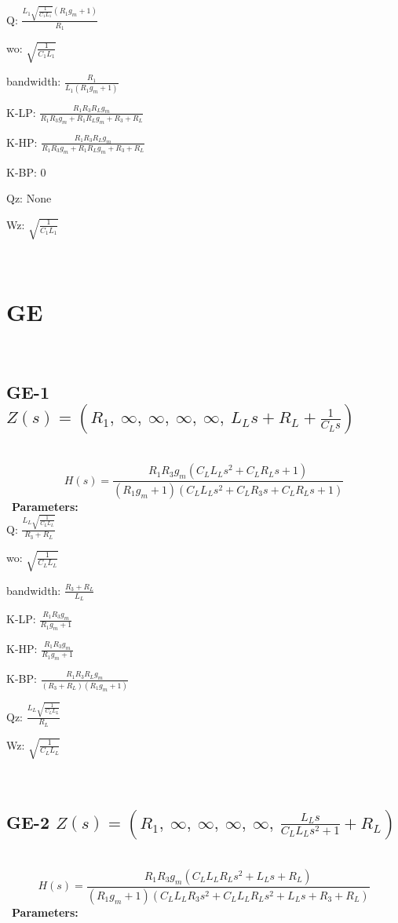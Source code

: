\documentclass{article}
\begin{document}
Q: $\frac{L_{1} \sqrt{\frac{1}{C_{1} L_{1}}} \left(R_{1} g_{m} + 1\right)}{R_{1}}$\ 

wo: $\sqrt{\frac{1}{C_{1} L_{1}}}$\ 

bandwidth: $\frac{R_{1}}{L_{1} \left(R_{1} g_{m} + 1\right)}$\ 

K-LP: $\frac{R_{1} R_{3} R_{L} g_{m}}{R_{1} R_{3} g_{m} + R_{1} R_{L} g_{m} + R_{3} + R_{L}}$\ 

K-HP: $\frac{R_{1} R_{3} R_{L} g_{m}}{R_{1} R_{3} g_{m} + R_{1} R_{L} g_{m} + R_{3} + R_{L}}$\ 

K-BP: $0$\ 

Qz: $\text{None}$\ 

Wz: $\sqrt{\frac{1}{C_{1} L_{1}}}$\ 

\ 

\section{GE}\ 
\subsection{GE-1 $Z(s) = \left( R_{1}, \  \infty, \  \infty, \  \infty, \  \infty, \  L_{L} s + R_{L} + \frac{1}{C_{L} s}\right)$ } \ 
\textbf{\[H(s) = \frac{R_{1} R_{3} g_{m} \left(C_{L} L_{L} s^{2} + C_{L} R_{L} s + 1\right)}{\left(R_{1} g_{m} + 1\right) \left(C_{L} L_{L} s^{2} + C_{L} R_{3} s + C_{L} R_{L} s + 1\right)}\] } \ 
\textbf{Parameters:}\\ 

Q: $\frac{L_{L} \sqrt{\frac{1}{C_{L} L_{L}}}}{R_{3} + R_{L}}$\ 

wo: $\sqrt{\frac{1}{C_{L} L_{L}}}$\ 

bandwidth: $\frac{R_{3} + R_{L}}{L_{L}}$\ 

K-LP: $\frac{R_{1} R_{3} g_{m}}{R_{1} g_{m} + 1}$\ 

K-HP: $\frac{R_{1} R_{3} g_{m}}{R_{1} g_{m} + 1}$\ 

K-BP: $\frac{R_{1} R_{3} R_{L} g_{m}}{\left(R_{3} + R_{L}\right) \left(R_{1} g_{m} + 1\right)}$\ 

Qz: $\frac{L_{L} \sqrt{\frac{1}{C_{L} L_{L}}}}{R_{L}}$\ 

Wz: $\sqrt{\frac{1}{C_{L} L_{L}}}$\ 

\ 

\subsection{GE-2 $Z(s) = \left( R_{1}, \  \infty, \  \infty, \  \infty, \  \infty, \  \frac{L_{L} s}{C_{L} L_{L} s^{2} + 1} + R_{L}\right)$ } \ 
\textbf{\[H(s) = \frac{R_{1} R_{3} g_{m} \left(C_{L} L_{L} R_{L} s^{2} + L_{L} s + R_{L}\right)}{\left(R_{1} g_{m} + 1\right) \left(C_{L} L_{L} R_{3} s^{2} + C_{L} L_{L} R_{L} s^{2} + L_{L} s + R_{3} + R_{L}\right)}\] } \ 
\textbf{Parameters:}\\ 
\end{document}
